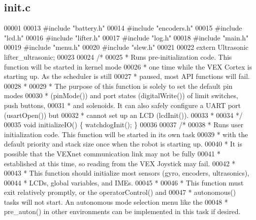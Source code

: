\subsection{init.\+c}
\label{init_8c_source}

\begin{DoxyCode}
00001 
00013 \textcolor{preprocessor}{#include "battery.h"}
00014 \textcolor{preprocessor}{#include "encoders.h"}
00015 \textcolor{preprocessor}{#include "lcd.h"}
00016 \textcolor{preprocessor}{#include "lifter.h"}
00017 \textcolor{preprocessor}{#include "log.h"}
00018 \textcolor{preprocessor}{#include "main.h"}
00019 \textcolor{preprocessor}{#include "menu.h"}
00020 \textcolor{preprocessor}{#include "slew.h"}
00021 
00022 \textcolor{keyword}{extern} Ultrasonic lifter_ultrasonic;
00023 
00024 \textcolor{comment}{/*}
00025 \textcolor{comment}{ * Runs pre-initialization code. This function will be started in kernel mode}
00026 \textcolor{comment}{ * one time while the VEX Cortex is starting up. As the scheduler is still}
00027 \textcolor{comment}{ * paused, most API functions will fail.}
00028 \textcolor{comment}{ *}
00029 \textcolor{comment}{ * The purpose of this function is solely to set the default pin modes}
00030 \textcolor{comment}{ * (pinMode()) and port states (digitalWrite()) of limit switches, push buttons,}
00031 \textcolor{comment}{ * and solenoids. It can also safely configure a UART port (usartOpen()) but}
00032 \textcolor{comment}{ * cannot set up an LCD (lcdInit()).}
00033 \textcolor{comment}{ *}
00034 \textcolor{comment}{ */}
00035 \textcolor{keywordtype}{void} initializeIO() \{ watchdogInit(); \}
00036 
00037 \textcolor{comment}{/*}
00038 \textcolor{comment}{ * Runs user initialization code. This function will be started in its own task}
00039 \textcolor{comment}{ * with the default priority and stack size once when the robot is starting up.}
00040 \textcolor{comment}{ * It is possible that the VEXnet communication link may not be fully}
00041 \textcolor{comment}{ * established at this time, so reading from the VEX Joystick may fail.}
00042 \textcolor{comment}{ *}
00043 \textcolor{comment}{ * This function should initialize most sensors (gyro, encoders, ultrasonics),}
00044 \textcolor{comment}{ * LCDs, global variables, and IMEs.}
00045 \textcolor{comment}{ *}
00046 \textcolor{comment}{ * This function must exit relatively promptly, or the operatorControl() and}
00047 \textcolor{comment}{ * autonomous() tasks will not start. An autonomous mode selection menu like the}
00048 \textcolor{comment}{ * pre\_auton() in other environments can be implemented in this task if desired.}

\end{DoxyCode}
